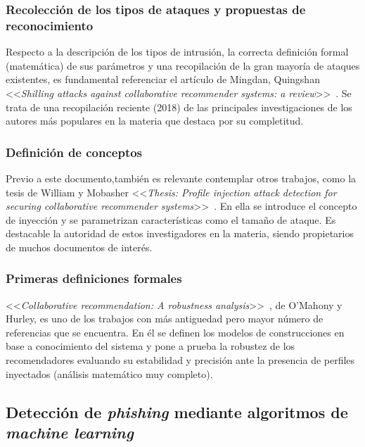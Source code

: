 \subsubsection{Recolección de los tipos de ataques y propuestas de reconocimiento~\cite{mingdan2018ShillingAttacksAReview}}
Respecto a la descripción de los tipos de intrusión, la correcta definición formal (matemática) de sus parámetros y una recopilación de la gran mayoría de ataques existentes, es fundamental referenciar el artículo de Mingdan, Quingshan <<\textit{Shilling attacks against collaborative recommender systems: a review}>>~\cite{mingdan2018ShillingAttacksAReview}. Se trata de una recopilación reciente (2018) de las principales investigaciones de los autores más populares en la materia que destaca por su completitud.

\subsubsection{Definición de conceptos~\cite{Mobasher2006Thesis}}
Previo a este documento,también es relevante contemplar otros trabajos, como la tesis de William y Mobasher <<\textit{Thesis: Profile injection attack detection for securing collaborative recommender systems}>>~\cite{Mobasher2006Thesis}. En ella se introduce el concepto de inyección y se parametrizan características como el tamaño de ataque. Es destacable la autoridad de estos investigadores en la materia, siendo propietarios de muchos documentos de interés.

\subsubsection{Primeras definiciones formales~\cite{mahony2004CollaborativeRecommendation}}
<<\textit{Collaborative recommendation: A robustness analysis}>>~\cite{mahony2004CollaborativeRecommendation}, de O'Mahony y Hurley, es uno de los trabajos con más antiguedad pero mayor número de referencias que se encuentra. En él se definen los modelos de construcciones en base a conocimiento del sistema y pone a prueba la robustez de los recomendadores evaluando su estabilidad y precisión ante la presencia de perfiles inyectados (análisis matemático muy completo).

\subsection{Detección de \textit{phishing} mediante algoritmos de \textit{machine learning}}

